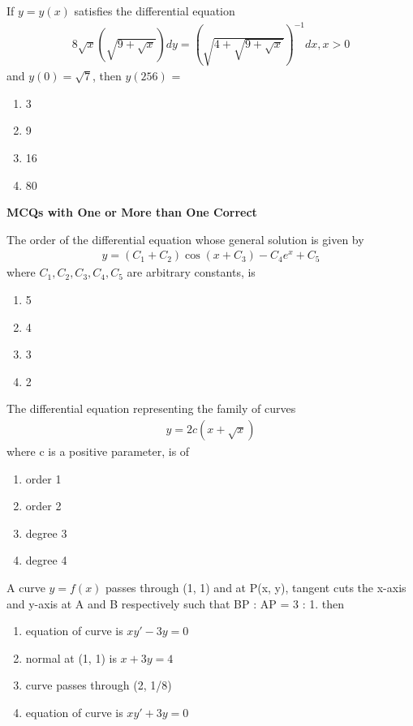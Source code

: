 \item If $y = y(x)$ satisfies the differential equation
\begin{align*}
8\sqrt{x}\left(\sqrt{9 + \sqrt{x}}\right)dy = \left(\sqrt{4 + \sqrt{9 + \sqrt{x}}}\right)^{-1}dx, x > 0
\end{align*}
and $y(0) = \sqrt{7}$, then $y(256)$ = 
\begin{enumerate}
\item 3
\item 9
\item 16
\item 80
\end{enumerate}

\textbf{MCQs with One or More than One Correct}

\item The order of the differential equation whose general solution is given by
\begin{align*}
y = (C_1 + C_2)\cos(x + C_3) - C_4e^x + C_5
\end{align*}
where $C_1, C_2, C_3, C_4, C_5$ are arbitrary constants, is
\begin{enumerate}
\item 5
\item 4
\item 3
\item 2
\end{enumerate}

\item The differential equation representing the family of curves
\begin{align*}
y = 2c\left(x + \sqrt{x}\right)
\end{align*}
where c is a positive parameter, is of
\begin{enumerate}
\item order 1
\item order 2
\item degree 3
\item degree 4
\end{enumerate}

\item A curve $y = f(x)$ passes through (1, 1) and at P(x, y), tangent cuts the x-axis and y-axis at A and B respectively such that BP : AP = 3 : 1. then
\begin{enumerate}
\item equation of curve is $xy' - 3y = 0$
\item normal at (1, 1) is $x + 3y = 4$
\item curve passes through (2, 1/8)
\item equation of curve is $xy' + 3y = 0$
\end{enumerate}

